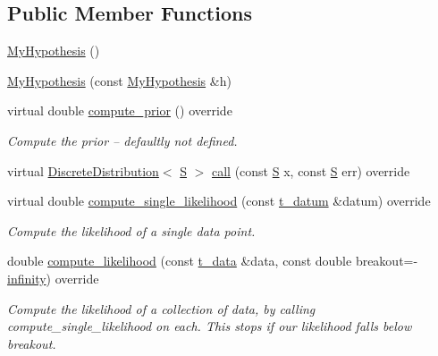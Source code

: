 \subsection*{Public Member Functions}
\begin{DoxyCompactItemize}
\item 
\hyperlink{class_my_hypothesis_ab3ad1dfa93e404fd827df6a57185f5a7}{My\+Hypothesis} ()
\item 
\hyperlink{class_my_hypothesis_a63709659c875c246a506dcff907e1cdd}{My\+Hypothesis} (const \hyperlink{class_my_hypothesis}{My\+Hypothesis} \&h)
\item 
virtual double \hyperlink{class_my_hypothesis_ab092094c5fc31730de4f40609220bb18}{compute\+\_\+prior} () override
\begin{DoxyCompactList}\small\item\em Compute the prior -- defaultly not defined. \end{DoxyCompactList}\item 
virtual \hyperlink{class_discrete_distribution}{Discrete\+Distribution}$<$ \hyperlink{_formal_language_theory-_complex_2_main_8cpp_a51c40915539205f0b5add30b0d68a4cb}{S} $>$ \hyperlink{class_my_hypothesis_a61391d3f1f6fbbe37663b22e2068ac90}{call} (const \hyperlink{_formal_language_theory-_complex_2_main_8cpp_a51c40915539205f0b5add30b0d68a4cb}{S} x, const \hyperlink{_formal_language_theory-_complex_2_main_8cpp_a51c40915539205f0b5add30b0d68a4cb}{S} err) override
\item 
virtual double \hyperlink{class_my_hypothesis_af60601a7db23e9ed8d1e3343af506733}{compute\+\_\+single\+\_\+likelihood} (const \hyperlink{class_bayesable_a7c93a2eeab708378eb321745908718d4}{t\+\_\+datum} \&datum) override
\begin{DoxyCompactList}\small\item\em Compute the likelihood of a single data point. \end{DoxyCompactList}\item 
double \hyperlink{class_my_hypothesis_a557264ea2caf1b983d621a112cb762c6}{compute\+\_\+likelihood} (const \hyperlink{class_bayesable_a70a593a67c7d43239ecc06bb4fd06a6b}{t\+\_\+data} \&data, const double breakout=-\/\hyperlink{_numerics_8h_a1bb1e42ae1b40cad6e99da0aab8a5576}{infinity}) override
\begin{DoxyCompactList}\small\item\em Compute the likelihood of a collection of data, by calling compute\+\_\+single\+\_\+likelihood on each. This stops if our likelihood falls below breakout. \end{DoxyCompactList}\item 

\end{DoxyCompactItemize}
